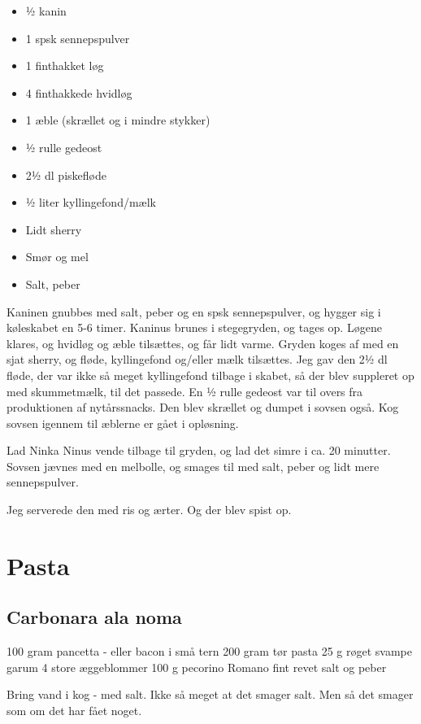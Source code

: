 \documentclass[
]{book}
\providecommand{\tightlist}{%
  \setlength{\itemsep}{0pt}\setlength{\parskip}{0pt}}
\begin{document}
\begin{itemize}
\tightlist
\item
  ½ kanin
\item
  1 spsk sennepspulver
\item
  1 finthakket løg
\item
  4 finthakkede hvidløg
\item
  1 æble (skrællet og i mindre stykker)
\item
  ½ rulle gedeost
\item
  2½ dl piskefløde
\item
  ½ liter kyllingefond/mælk
\item
  Lidt sherry
\item
  Smør og mel
\item
  Salt, peber
\end{itemize}

Kaninen gnubbes med salt, peber og en spsk sennepspulver, og hygger sig i køleskabet en 5-6 timer.
Kaninus brunes i stegegryden, og tages op.
Løgene klares, og hvidløg og æble tilsættes, og får lidt varme.
Gryden koges af med en sjat sherry, og fløde, kyllingefond og/eller mælk tilsættes.
Jeg gav den 2½ dl fløde, der var ikke så meget kyllingefond tilbage i skabet, så der blev suppleret op med skummetmælk, til det passede.
En ½ rulle gedeost var til overs fra produktionen af nytårssnacks. Den blev skrællet og dumpet i sovsen også. Kog sovsen igennem til æblerne er gået i opløsning.

Lad Ninka Ninus vende tilbage til gryden, og lad det simre i ca. 20 minutter.
Sovsen jævnes med en melbolle, og smages til med salt, peber og lidt mere sennepspulver.

Jeg serverede den med ris og ærter. Og der blev spist op.

\chapter{Pasta}\label{pasta}

\section{Carbonara ala noma}\label{carbonara-ala-noma}

100 gram pancetta - eller bacon i små tern
200 gram tør pasta
25 g røget svampe garum
4 store æggeblommer
100 g pecorino Romano fint revet
salt og peber

Bring vand i kog - med salt. Ikke så meget at det smager salt.
Men så det smager som om det har fået noget.
\end{document}
